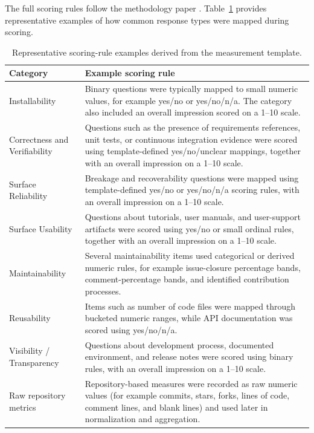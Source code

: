 \documentclass[final,1p,times,authoryear,12pt]{elsarticle}
\begin{document}
The full scoring rules follow the methodology paper
\cite{MethodologyPaper}. Table~\ref{tab:scoring-rules}
provides representative examples of how common response
types were mapped during scoring.

\begin{table}[H]
\centering
\caption{Representative scoring-rule examples derived from
the measurement template.}
\label{tab:scoring-rules}
\begin{tabularx}{\textwidth}{l X}
\toprule
\textbf{Category} & \textbf{Example scoring rule} \\
\midrule
Installability &
Binary questions were typically mapped to small numeric
values, for example yes/no or yes/no/n/a. The category also
included an overall impression scored on a 1--10 scale. \\

Correctness and Verifiability &
Questions such as the presence of requirements references,
unit tests, or continuous integration evidence were scored
using template-defined yes/no/unclear mappings, together
with an overall impression on a 1--10 scale. \\

Surface Reliability &
Breakage and recoverability questions were mapped using
template-defined yes/no or yes/no/n/a scoring rules, with
an overall impression on a 1--10 scale. \\

Surface Usability &
Questions about tutorials, user manuals, and user-support
artifacts were scored using yes/no or small ordinal rules,
together with an overall impression on a 1--10 scale. \\

Maintainability &
Several maintainability items used categorical or derived
numeric rules, for example issue-closure percentage bands,
comment-percentage bands, and identified contribution
processes. \\

Reusability &
Items such as number of code files were mapped through
bucketed numeric ranges, while API documentation was scored
using yes/no/n/a. \\

Visibility / Transparency &
Questions about development process, documented environment,
and release notes were scored using binary rules, with an
overall impression on a 1--10 scale. \\

Raw repository metrics &
Repository-based measures were recorded as raw numeric
values (for example commits, stars, forks, lines of code,
comment lines, and blank lines) and used later in
normalization and aggregation. \\
\bottomrule
\end{tabularx}
\end{table}
\end{document}
